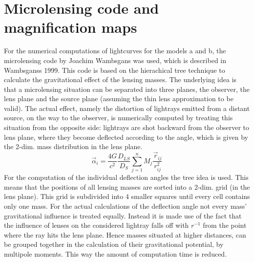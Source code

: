 \section{Microlensing code and magnification maps}
For the numerical computations of lightcurves for the models a and b, the microlensing code by Joachim Wambsgans was used, which is described in Wambsganss 1999. This code is based on the hierachical tree technique to calculate the gravitational effect of the lensing masses. The underlying idea is that a microlensing situation can be separated into three planes, the observer, the lens plane and the source plane (assuming the thin lens approximation to be valid). The actual effect, namely the distortion of lightrays emitted from a distant source, on the way to the observer, is numerically computed by treating this situation from the opposite side: lightrays are shot backward from the observer to lens plane, where they become deflected according to the angle, which is given by the 2-dim. mass distribution in the lens plane.
\begin{equation}
\vec{\alpha}_{i}=\frac{4G}{c^{2}} \frac{D_{LS}}{D_{S}}\sum_{j=1}^{n}M_j \frac{\vec{r}_{ij}}{r^2_{ij}} 
\end{equation}  
For the computation of the individual deflection angles the tree idea is used. This means that the positions of all lensing masses are sorted into a 2-dim. grid (in the lens plane). This grid is subdivided into 4 smaller squares until every cell contains only one mass. For the actual calculations of the deflection angle not every mass' gravitational influence is treated equally. Instead it is made use of the fact that the influence of lenses on the considered lightray falls off with $r^{-1}$ from the point where the ray hits the lens plane. Hence masses situated at higher distances, can be grouped together in the calculation of their gravitational potential, by multipole moments. This way the amount of computation time is reduced. \\
